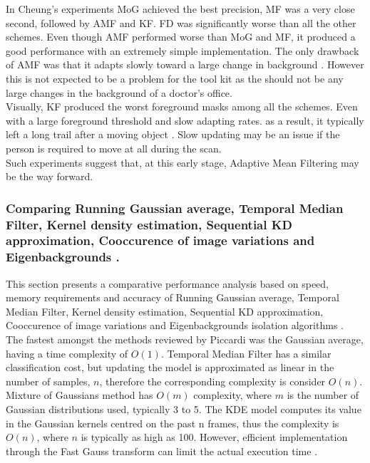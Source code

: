 In Cheung's experiments \cite{Cheung2007} MoG achieved the best precision, MF was a very close second, followed by AMF and KF. FD was significantly worse than all the other schemes. Even though AMF performed worse than MoG and MF, it produced a good performance with an extremely simple implementation. The only drawback of AMF was that it adapts slowly toward a large change in background \cite{Cheung2007}. However this is not expected to be a problem for the tool kit as the should not be any large changes in the background of a doctor's office.\\

Visually, KF produced the worst foreground masks among all the schemes. Even with a large foreground threshold and slow adapting rates. as a result, it typically left a long trail after a moving object \cite{Cheung2007}. Slow updating may be an issue if the  person is required to move at all during the scan.\\

Such experiments suggest that, at this early stage, Adaptive Mean Filtering may be the way forward.\\

\subsubsection{Comparing Running Gaussian average, Temporal Median Filter, Kernel density estimation, Sequential KD approximation, Cooccurence of image variations and Eigenbackgrounds \cite{Piccardi2004}.}

This section presents a comparative performance analysis based on
speed, memory requirements and accuracy of Running Gaussian average, Temporal Median Filter, Kernel density estimation, Sequential KD approximation, Cooccurence of image variations and Eigenbackgrounds isolation algorithms \cite{Piccardi2004}.\\

The fastest amongst the methods reviewed by Piccardi \cite{Piccardi2004} was the Gaussian average, having a time complexity of $O(1)$.
Temporal Median Filter has a similar classification cost, but updating the  model is approximated as linear in the number of samples, $n$, therefore the corresponding complexity is consider $O(n)$. Mixture of Gaussians method has $O(m)$ complexity, where $m$ is the number of Gaussian distributions used, typically 3 to 5. The KDE model computes its value in the Gaussian kernels centred on the past 
n frames, thus the complexity is $O(n)$, where $n$ is typically as high as 100. However, efficient implementation through the Fast Gauss transform can
limit the actual execution time \cite{Elgammal2003}.





